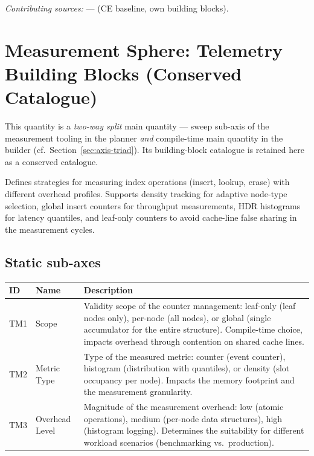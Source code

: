 \emph{Contributing sources:} --- (CE baseline, own building blocks).

\section[head={Measurement Sphere: Telemetry Building Blocks}]{Measurement Sphere: Telemetry Building Blocks (Conserved Catalogue)}

This quantity is a \emph{two-way split} main quantity --- sweep sub-axis of the measurement tooling in the planner \emph{and} compile-time main quantity in the builder (cf.\ Section~\ref{sec:axis-triad}). Its building-block catalogue is retained here as a conserved catalogue.

Defines strategies for measuring index operations (insert, lookup, erase) with different overhead profiles. Supports density tracking for adaptive node-type selection, global insert counters for throughput measurements, HDR histograms for latency quantiles, and leaf-only counters to avoid cache-line false sharing in the measurement cycles.

\subsection*{Static sub-axes}

\begin{scriptsize}
\begin{longtable}{@{}>{\raggedright\arraybackslash}p{1.8cm} >{\raggedright\arraybackslash}p{3.2cm} >{\raggedright\arraybackslash}p{8.5cm}@{}}
\toprule
ID & Name & Description \\
\midrule
\endhead%
TM1 & Scope & Validity scope of the counter management: leaf-only (leaf nodes only), per-node (all nodes), or global (single accumulator for the entire structure). Compile-time choice, impacts overhead through contention on shared cache lines. \\
TM2 & Metric Type & Type of the measured metric: counter (event counter), histogram (distribution with quantiles), or density (slot occupancy per node). Impacts the memory footprint and the measurement granularity. \\
TM3 & Overhead Level & Magnitude of the measurement overhead: low (atomic operations), medium (per-node data structures), high (histogram logging). Determines the suitability for different workload scenarios (benchmarking vs.\ production). \\
\bottomrule
\end{longtable}
\end{scriptsize}

